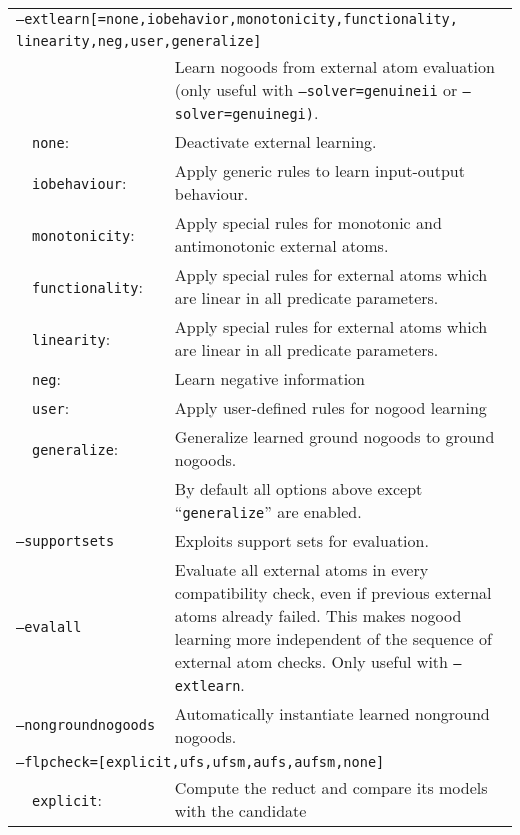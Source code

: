 \documentclass[a4paper, titlepage]{article}
\begin{document}
\begin{longtable}{ p{2.0em} p{2.2cm} p{0.6cm} p{8.0cm} } 
\multicolumn{4}{p{6cm}}{\texttt{--extlearn[=none,iobehavior,monotonicity,functionality,}} \\[-1.5ex]
\multicolumn{4}{p{6cm}}{\texttt{\hphantom{--extlearn[}linearity,neg,user,generalize]}} \\

& & & Learn nogoods from external atom evaluation (only useful with \texttt{--solver=genuineii} or \texttt{--solver=genuinegi)}.\\
&\texttt{none}:& & Deactivate external learning. \\
&\texttt{iobehaviour}:& &Apply generic rules to learn input-output behaviour. \\
&\texttt{monotonicity}:& &Apply special rules for monotonic and antimonotonic external atoms.\\
&\texttt{functionality}:& &Apply special rules for external atoms which are linear in all predicate parameters.\\
&\texttt{linearity}:& &Apply special rules for external atoms which are linear in all predicate parameters.\\
&\texttt{neg}:& &Learn negative information\\
&\texttt{user}:& &Apply user-defined rules for nogood learning\\
&\texttt{generalize}:& &Generalize learned ground nogoods to ground nogoods.\\
& & & By default all options above except ``\texttt{generalize}'' are enabled.\\
\multicolumn{3}{l}{\texttt{--supportsets}} &
  Exploits support sets for evaluation.\\
\multicolumn{3}{l}{\texttt{--evalall}} &
  Evaluate all external atoms in every compatibility check, even if previous external atoms already failed.  This makes nogood learning more independent of the sequence of external atom checks. Only useful with \texttt{--extlearn}.\\
\multicolumn{3}{l}{\texttt{--nongroundnogoods}} &
Automatically instantiate learned nonground nogoods.\\
\multicolumn{4}{l}{\texttt{--flpcheck=[explicit,ufs,ufsm,aufs,aufsm,none]}} \\
&\texttt{explicit}:&&Compute the reduct and compare its models with the candidate\\

\end{longtable}
\end{document}
